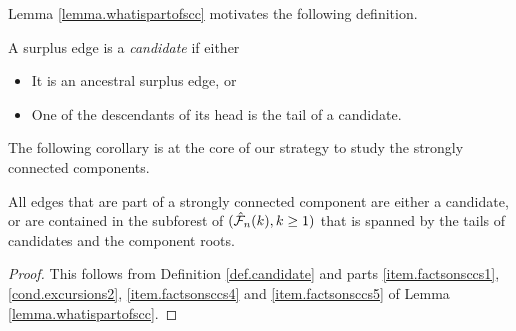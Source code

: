 Lemma \ref{lemma.whatispartofscc} motivates the following definition.
\begin{definition}\label{def.candidate}
A surplus edge is a \emph{candidate} if either
\begin{itemize}
    \item It is an ancestral surplus edge, or
    \item One of the descendants of its head is the tail of a candidate.
\end{itemize}
\end{definition}
The following corollary is at the core of our strategy to study the strongly connected components.
\begin{corollary}\label{cor.edgesinSCCs}
All edges that are part of a strongly connected component are either a candidate, or are contained in the subforest of $(\hat{{\mathcal F}}_n(k),k\geq 1)$ that is spanned by the tails of candidates and the component roots.
\end{corollary}
\begin{proof}
This follows from Definition \ref{def.candidate} and parts \ref{item.factsonsccs1}, \ref{cond.excursions2}, \ref{item.factsonsccs4} and \ref{item.factsonsccs5} of Lemma \ref{lemma.whatispartofscc}.
\end{proof}
